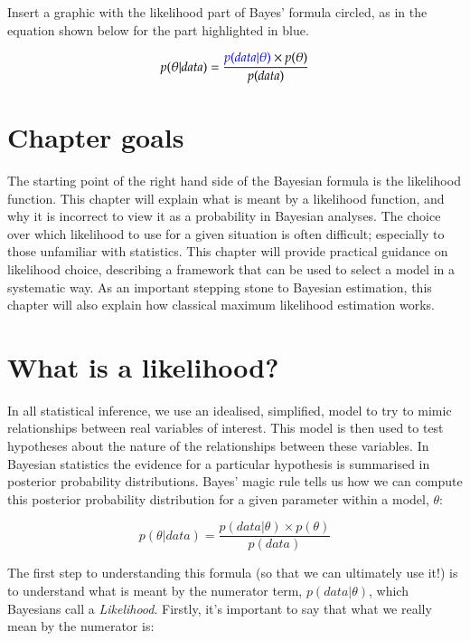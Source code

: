 \documentclass[11pt,fullpage]{book}
\begin{document}
Insert a graphic with the likelihood part of Bayes' formula circled, as in the equation shown below for the part highlighted in blue.

\begin{equation}
p(\theta|data) = \frac{{\color{blue}p(data|\theta)}\times p(\theta)}{p(data)}
\end{equation}\label{eq:Likelihood_BayesHighlighted}

\section{Chapter goals}
The starting point of the right hand side of the Bayesian formula is the likelihood function. This chapter will explain what is meant by a likelihood function, and why it is incorrect to view it as a probability in Bayesian analyses. The choice over which likelihood to use for a given situation is often difficult; especially to those unfamiliar with statistics. This chapter will provide practical guidance on likelihood choice, describing a framework that can be used to select a model in a systematic way. As an important stepping stone to Bayesian estimation, this chapter will also explain how classical maximum likelihood estimation works. 

\section{What is a likelihood?}
In all statistical inference, we use an idealised, simplified, model to try to mimic relationships between real variables of interest. This model is then used to test hypotheses about the nature of the relationships between these variables. In Bayesian statistics the evidence for a particular hypothesis is summarised in posterior probability distributions. Bayes' magic rule tells us how we can compute this posterior probability distribution for a given parameter within a model, $\theta$:

\begin{equation}
p(\theta|data) = \frac{p(data|\theta)\times p(\theta)}{p(data)}
\end{equation}\label{eq:Likelihood_Bayes}

The first step to understanding this formula (so that we can ultimately use it!) is to understand what is meant by the numerator term, $p(data|\theta)$, which Bayesians call a \textit{Likelihood}. Firstly, it's important to say that what we really mean by the numerator is:
\end{document}
